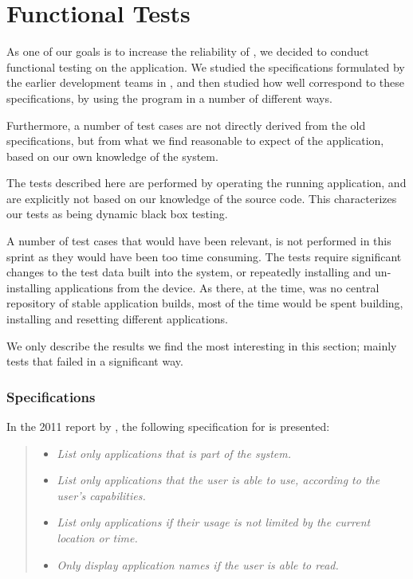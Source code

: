 \section{Functional Tests}\label{sec:sprint1:testing}

As one of our goals is to increase the reliability of \launcher, we decided to conduct functional testing on the application.
We studied the specifications formulated by the earlier development teams in \citet{launcher2011,launcher2012}, and then studied how well \launcher correspond to these specifications, by using the program in a number of different ways. 

Furthermore, a number of test cases are not directly derived from the old specifications, but from what we find reasonable to expect of the application, based on our own knowledge of the system.

The tests described here are performed by operating the running application, and are explicitly not based on our knowledge of the source code. 
This characterizes our tests as being dynamic black box testing. 

A number of test cases that would have been relevant, is not performed in this sprint as they would have been too time consuming. 
The tests require significant changes to the test data built into the \giraf system, or repeatedly installing and un-installing applications from the device.
As there, at the time, was no central repository of stable application builds, most of the time would be spent building, installing and resetting different applications.

We only describe the results we find the most interesting in this section; mainly tests that failed in a significant way.

\subsubsection*{Specifications}
In the 2011 report by \citet{launcher2011}, the following specification for \launcher is presented:

\begin{quote}
\begin{itemize}
	\item \textit{List only applications that is part of the \giraf system.}
	\item \textit{List only applications that the user is able to use, according to the user's capabilities.}
	\item \textit{List only applications if their usage is not limited by the current location or time.}
	\item \textit{Only display application names if the user is able to read.}
\end{itemize}
\end{quote}

